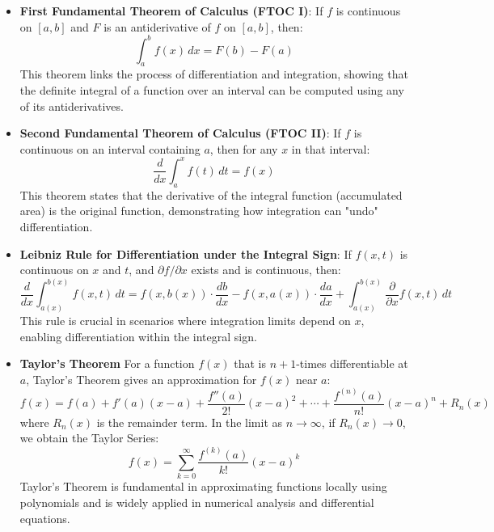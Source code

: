 \begin{itemize}
\item \textbf{First Fundamental Theorem of Calculus (FTOC I)}: 
If \( f \) is continuous on \( [a, b] \) and \( F \) is an antiderivative of \( f \) on \( [a, b] \), then:
\[\int_a^b f(x) \, dx = F(b) - F(a)\]
This theorem links the process of differentiation and integration, showing that the definite integral of a function over an interval can be computed using any of its antiderivatives.

\item \textbf{Second Fundamental Theorem of Calculus (FTOC II)}: 
If \( f \) is continuous on an interval containing \( a \), then for any \( x \) in that interval:
\[\frac{d}{dx} \int_a^x f(t) \, dt = f(x)\]
This theorem states that the derivative of the integral function (accumulated area) is the original function, demonstrating how integration can "undo" differentiation.

\item \textbf{Leibniz Rule for Differentiation under the Integral Sign}: 
If \( f(x, t) \) is continuous on \( x \) and \( t \), and \( \partial f / \partial x \) exists and is continuous, then:
\[\frac{d}{dx} \int_{a(x)}^{b(x)} f(x, t) \, dt = f(x, b(x)) \cdot \frac{db}{dx} - f(x, a(x)) \cdot \frac{da}{dx} + \int_{a(x)}^{b(x)} \frac{\partial}{\partial x} f(x, t) \, dt\]
This rule is crucial in scenarios where integration limits depend on \( x \), enabling differentiation within the integral sign.

\item \textbf{Taylor’s Theorem} 
For a function \( f(x) \) that is \( n+1 \)-times differentiable at \( a \), Taylor’s Theorem gives an approximation for \( f(x) \) near \( a \):
\[f(x) = f(a) + f'(a)(x-a) + \frac{f''(a)}{2!}(x-a)^2 + \cdots + \frac{f^{(n)}(a)}{n!}(x-a)^n + R_n(x)\]
where \( R_n(x) \) is the remainder term. In the limit as \( n \to \infty \), if \( R_n(x) \to 0 \), we obtain the Taylor Series:
\[f(x) = \sum_{k=0}^{\infty} \frac{f^{(k)}(a)}{k!} (x-a)^k\]
Taylor's Theorem is fundamental in approximating functions locally using polynomials and is widely applied in numerical analysis and differential equations.


\end{itemize}


